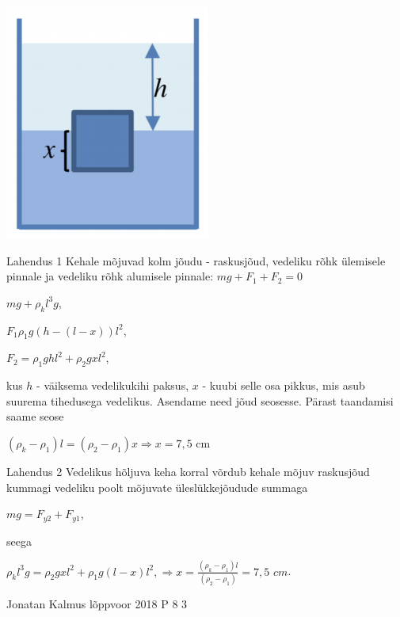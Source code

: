 \documentclass[11pt]{article}
\begin{document}
{{\ifSolution
\begin{center}
	\includegraphics[width=0.5\linewidth]{2018-v3p-04-lah.PNG}
\end{center}
Lahendus 1
Kehale mõjuvad kolm jõudu - raskusjõud, vedeliku rõhk ülemisele pinnale ja vedeliku rõhk alumisele pinnale: $mg + F_1 + F_2 =0$
\begin{center}
$mg + \rho_k l^3 g$,
\end{center}
\begin{center}
$F_1 \rho_1 g (h - (l - x)) l^2$,
\end{center}
\begin{center}
$F_2 = \rho_1 g h l^2 + \rho_2 g x l^2$,
\end{center}
kus $h$ - väiksema vedelikukihi paksus, $x$ - kuubi selle osa pikkus, mis asub suurema tihedusega vedelikus. Asendame need jõud seosesse. Pärast taandamisi saame seose
\begin{center}
$(\rho_k - \rho_1)l = (\rho_2 - \rho_1)x \Rightarrow x = 7,5$ cm
\end{center}
Lahendus 2
Vedelikus hõljuva keha korral võrdub kehale mõjuv raskusjõud kummagi vedeliku poolt mõjuvate üleslükkejõudude summaga
\begin{center}
$mg = F_{y2} + F_{y1}$,
\end{center}
seega 
\begin{center}
$\rho_k l^3 g = \rho_2 g x l^2 + \rho_1 g (l - x)l^2, \Rightarrow x = \frac{ (\rho_k - \rho_1) l} {(\rho_2 - \rho_1)} = 7,5$ $cm$.
\end{center}
\fi
}


{Jonatan Kalmus} %
{lõppvoor} %
{2018} %
{P 8} %
{3} %
{

}}
\end{document}
